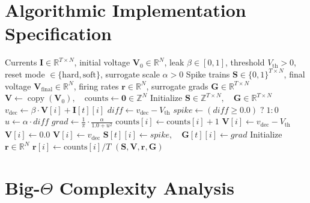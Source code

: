 \documentclass[11pt,a4paper]{article}
\theoremstyle{definition}
\begin{document}
\section{Algorithmic Implementation Specification}

\begin{algorithm}[H]
\caption{Leaky Integrate-and-Fire Dynamic Simulation with Surrogate Gradients}
\begin{algorithmic}[1]
\Require Currents $\mathbf{I} \in \mathbb{R}^{T \times N}$, initial voltage $\mathbf{V}_0 \in \mathbb{R}^N$, leak $\beta \in [0, 1]$, threshold $V_{\text{th}} > 0$, reset mode $\in \{\text{hard}, \text{soft}\}$, surrogate scale $\alpha > 0$
\Ensure Spike trains $\mathbf{S} \in \{0, 1\}^{T \times N}$, final voltage $\mathbf{V}_{\text{final}} \in \mathbb{R}^N$, firing rates $\mathbf{r} \in \mathbb{R}^N$, surrogate grads $\mathbf{G} \in \mathbb{R}^{T \times N}$
\State $\mathbf{V} \gets \operatorname{copy}(\mathbf{V}_0), \quad \text{counts} \gets \mathbf{0} \in \mathbb{Z}^N$
\State Initialize $\mathbf{S} \in \mathbb{Z}^{T \times N}, \quad \mathbf{G} \in \mathbb{R}^{T \times N}$
        \State $v_{\text{dec}} \gets \beta \cdot \mathbf{V}[i] + \mathbf{I}[t][i]$ 
        \State $diff \gets v_{\text{dec}} - V_{\text{th}}$
        \State $spike \gets (diff \ge 0.0) \;?\; 1 : 0$ 
        \State $u \gets \alpha \cdot diff$ 
        \State $grad \gets \frac{1}{\pi} \cdot \frac{\alpha}{1.0 + u^2}$
         
            \State $\text{counts}[i] \gets \text{counts}[i] + 1$
                \State $\mathbf{V}[i] \gets v_{\text{dec}} - V_{\text{th}}$
            \Else
                \State $\mathbf{V}[i] \gets 0.0$
            \EndIf
        \Else
            \State $\mathbf{V}[i] \gets v_{\text{dec}}$
        \EndIf
        \State $\mathbf{S}[t][i] \gets spike, \quad \mathbf{G}[t][i] \gets grad$
    \EndFor
\EndFor
\State Initialize $\mathbf{r} \in \mathbb{R}^N$
    \State $\mathbf{r}[i] \gets \text{counts}[i] / T$
\EndFor
\State \Return $(\mathbf{S}, \mathbf{V}, \mathbf{r}, \mathbf{G})$
\end{algorithmic}
\end{algorithm}

\section{Big-$\Theta$ Complexity Analysis}
\end{document}
